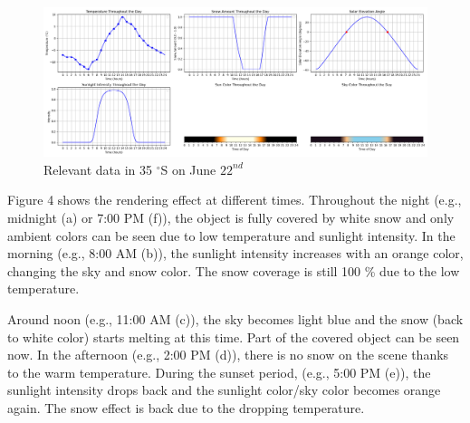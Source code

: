 \documentclass{article}
\begin{document}
\begin{figure}[h]
  \centering
  \begin{minipage}{1.00\textwidth}
      \centering
      \includegraphics[width=\textwidth]{images/Plot35N.png}
      \caption{Relevant data in 35 $^{\circ}$S on June \(22^{nd}\)}
      \label{fig:Plot35N}
  \end{minipage}
\end{figure}

Figure 4 shows the rendering effect at different times. Throughout the night (e.g., midnight (a) or 7:00 PM (f)), the object is fully 
covered by white snow and only ambient colors can be seen due to low temperature and sunlight intensity. In the morning (e.g., 8:00 
AM (b)), the sunlight intensity increases with an orange color, changing the sky and snow color. The snow coverage is still 100 \% due
to the low temperature. 

Around noon (e.g., 11:00 AM (c)), the sky becomes light blue and the snow (back to white color) starts melting at this time. Part of 
the covered object can be seen now. In the afternoon (e.g., 2:00 PM (d)), there is no snow on the scene thanks to the warm temperature. 
During the sunset period, (e.g., 5:00 PM (e)), the sunlight intensity drops back and the sunlight color/sky color becomes orange again. 
The snow effect is back due to the dropping temperature.
\end{document}
